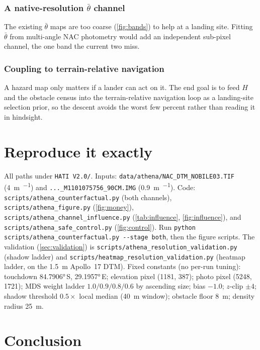 \documentclass[11pt]{article}
\begin{document}
\subsubsection{A native-resolution $\bar\theta$ channel}
The existing $\bar\theta$ maps are too coarse (\cref{fig:bands}) to help at a landing
site. Fitting $\bar\theta$ from multi-angle NAC photometry would add an independent
sub-pixel channel, the one band the current two miss.

\subsubsection{Coupling to terrain-relative navigation}
A hazard map only matters if a lander can act on it. The end goal is to feed $H$ and
the obstacle census into the terrain-relative navigation loop as a landing-site
selection prior, so the descent avoids the worst few percent rather than reading it
in hindsight.

\section{Reproduce it exactly}

All paths under \texttt{HATI V2.0/}. Inputs: \texttt{data/athena/NAC\_DTM\_NOBILE03.TIF}
(\SI{4}{\meter\per\px}) and \texttt{...\_M1101075756\_90CM.IMG} (\SI{0.9}{\meter\per\px}).
Code: \texttt{scripts/athena\_counterfactual.py} (both channels),
\texttt{scripts/athena\_figure.py} (\cref{fig:money}),
\texttt{scripts/athena\_channel\_influence.py} (\cref{tab:influence}, \cref{fig:influence}),
and \texttt{scripts/athena\_safe\_control.py} (\cref{fig:control}).
Run \texttt{python scripts/athena\_counterfactual.py -{}-stage both}, then the
figure scripts. The validation (\cref{sec:validation}) is
\texttt{scripts/athena\_resolution\_validation.py} (shadow ladder) and
\texttt{scripts/heatmap\_resolution\_validation.py} (heatmap ladder, on the
\SI{1.5}{m} Apollo~17 DTM). Fixed constants (no per-run tuning): touchdown \ang{84.7906}\,S,
\ang{29.1957}\,E; elevation pixel (1181, 387); photo pixel (5248, 1721); MDS weight
ladder $1.0/0.9/0.8/0.6$ by ascending size; bias $-1.0$; $z$-clip $\pm4$; shadow
threshold $0.5\times$ local median (\SI{40}{\meter} window); obstacle floor
\SI{8}{\meter}; density radius \SI{25}{\meter}.

\section{Conclusion}
\end{document}
